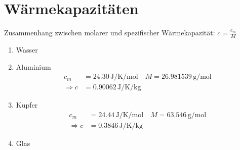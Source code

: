 \documentclass[a4paper]{article}
\begin{document}
\section{Wärmekapazitäten}
Zusammenhang zwischen molarer und spezifischer Wärmekapazität: 
$c = \frac{c_m}{M}$
\begin{enumerate}
	\item Wasser
	\item Aluminium \cite[16]{handbuch}
		\begin{align*}
			c_m &= 24.30 \, \si{\joule\per\kelvin\per\mol}
			\quad
			M = 26.981539 \, \si{\gram\per\mol} 
			\\
			\Rightarrow c &= 0.90062 \, \si{\joule\per\kelvin\per\kg}
		\end{align*}
	\item Kupfer \cite[133f]{handbuch}
		\begin{align*}
			c_m &= 24.44 \, \si{\joule\per\kelvin\per\mol}
			\quad
			M = 63.546 \, \si{\gram\per\mol} 
			\\
			\Rightarrow c &= 0.3846 \, \si{\joule\per\kelvin\per\kg}
		\end{align*}
	\item Glas \cite[944f]{handbuch}
\end{enumerate}

\printbibliography
\end{document}
